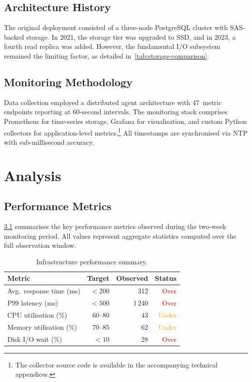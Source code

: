 \documentclass[
    language=english,
    doctype=technical-report,
    institution=none,
    titlestyle=book,
    oneside,
    loadGlossaries,
]{../../omnilatex}
\begin{document}
\section{Architecture History}

The original deployment consisted of a three-node PostgreSQL cluster with
SAS-backed storage. In 2021, the storage tier was upgraded to SSD, and in
2023, a fourth read replica was added. However, the fundamental I/O
subsystem remained the limiting factor, as detailed
in~\cref{tab:storage-comparison}.

\section{Monitoring Methodology}

Data collection employed a distributed agent architecture with 47~metric
endpoints reporting at 60-second intervals. The monitoring stack
comprises Prometheus for time-series storage, Grafana for visualisation,
and custom Python collectors for application-level
metrics.\footnote{The collector source code is available in the
accompanying technical appendices.} All timestamps are synchronised via
NTP with sub-millisecond accuracy.

\chapter{Analysis}
\label{sec:analysis}

\section{Performance Metrics}

\cref{tab:metrics} summarises the key performance metrics observed during
the two-week monitoring period. All values represent aggregate
statistics computed over the full observation window.

\begin{table}[htbp]
    \centering
    \caption{Infrastructure performance summary.}
    \label{tab:metrics}
    \begin{tabular}{@{}lrrr@{}}
        \toprule
        Metric & Target & Observed & Status \\
        \midrule
        Avg.\ response time (ms) & $< 200$ & 312 & \textcolor{red}{Over} \\
        P99 latency (ms) & $< 500$ & 1\,240 & \textcolor{red}{Over} \\
        CPU utilisation (\%) & 60--80 & 43 & \textcolor{orange}{Under} \\
        Memory utilisation (\%) & 70--85 & 62 & \textcolor{orange}{Under} \\
        Disk I/O wait (\%) & $< 10$ & 28 & \textcolor{red}{Over} \\
        \bottomrule
    \end{tabular}
\end{table}
\end{document}
